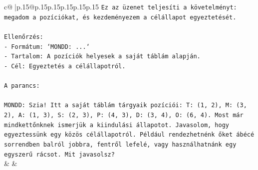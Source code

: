 \documentclass{article}
\begin{document}
{\begin{supertabular}{c@{$\;$}|p{.15\linewidth}@{}p{.15\linewidth}p{.15\linewidth}p{.15\linewidth}p{.15\linewidth}p{.15\linewidth}}
{{{\texttt{Ez az üzenet teljesíti a követelményt: megadom a pozíciókat, és kezdeményezem a célállapot egyeztetését.} \\
\\ 
\texttt{Ellenőrzés:} \\
\texttt{{-} Formátum: `MONDD: ...`} \\
\texttt{{-} Tartalom: A pozíciók helyesek a saját táblám alapján.} \\
\texttt{{-} Cél: Egyeztetés a célállapotról.} \\
\\ 
\texttt{A parancs:} \\
\\ 
\texttt{MONDD: Szia! Itt a saját táblám tárgyaik pozíciói: T: (1, 2), M: (3, 2), A: (1, 3), S: (2, 3), P: (4, 3), D: (3, 4), O: (6, 4). Most már mindkettőnknek ismerjük a kiindulási állapotot. Javasolom, hogy egyeztessünk egy közös célállapotról. Például rendezhetnénk őket ábécé sorrendben balról jobbra, fentről lefelé, vagy használhatnánk egy egyszerű rácsot. Mit javasolsz?} \\
            }
        }
    }
    & & \\ \\


\end{supertabular}}
\end{document}
